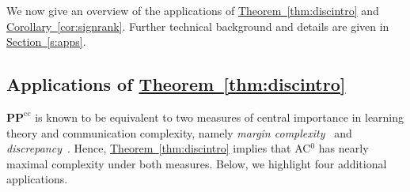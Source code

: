 \documentclass[11pt]{article}
\numberwithin{equation}{section}
\theoremstyle{definition}
\theoremstyle{plain}
\newcommand{\expref}[2]{\hyperref[#2]{#1~\ref{#2}}}
\newcommand{\PPcc}{\mathbf{PP}^{\text{cc}}}
\begin{document}
We now give an overview of the applications of \expref{Theorem}{thm:discintro} and \expref{Corollary}{cor:signrank}. Further technical background and details are given in \expref{Section}{s:apps}.

\vspace{-3mm}
\subsection{Applications of \expref{Theorem}{thm:discintro}}

$\PPcc$ is known to be equivalent to two measures of central importance in 
learning theory and communication complexity, namely \emph{margin complexity}~\cite{linial2009learning} and \emph{discrepancy}~\cite{klauck2001lower}.
Hence,
\expref{Theorem}{thm:discintro} implies that AC$^0$ has nearly maximal complexity under both measures. Below,
we highlight four additional applications. 
\end{document}
